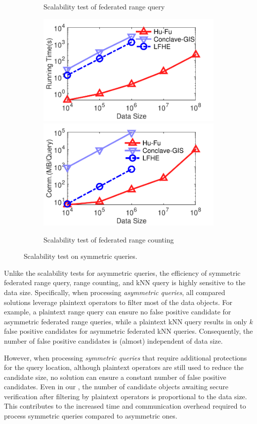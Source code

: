 \begin{figure}[t]
\begin{subfigure}{0.48\textwidth}
        \caption{Scalability test of federated range query}
        \label{fig:sca-rangquery-eff-size-n}
    \end{subfigure}
    \begin{subfigure}{0.48\textwidth}
        \centering
        \includegraphics[width=0.48\linewidth]{osm_rangecount_size_time.pdf}
        \includegraphics[width=0.48\linewidth]{osm_rangecount_size_comm.pdf}
        \caption{Scalability test of federated range counting}
        \label{fig:sca-rangecount-eff-size-n}
    \end{subfigure}
    \caption{Scalability test on symmetric queries.}
    \label{fig:sym-exp-scala}
\end{figure}

Unlike the scalability tests for asymmetric queries, the efficiency of symmetric federated range query, range counting, and kNN query is highly sensitive to the data size.
Specifically, when processing \textit{asymmetric queries}, all compared solutions leverage plaintext operators to filter most of the data objects.
For example, a plaintext range query can ensure no false positive candidate for asymmetric federated range queries, while a plaintext kNN query results in only $k$ false positive candidates for asymmetric federated kNN queries.
Consequently, the number of false positive candidates is (almost) independent of data size.

However, when processing \textit{symmetric queries} that require additional protections for the query location, although plaintext operators are still used to reduce the candidate size, no solution can ensure a constant number of false positive candidates.
Even in our \sysname, the number of candidate objects awaiting secure verification after filtering by plaintext operators is proportional to the data size.
This contributes to the increased time and communication overhead required to process symmetric queries compared to asymmetric ones.

